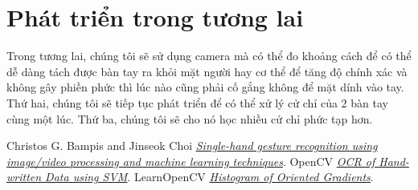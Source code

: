 \documentclass[a4paper, 12pt]{article}
\begin{document}
\section{Phát triển trong tương lai}
Trong tương lai, chúng tôi sẽ sử dụng camera mà có thể đo khoảng cách để có thể dễ dàng tách được bàn tay ra khỏi mặt người hay cơ thể để tăng độ chính xác và không gây phiền phức thì lúc nào cũng phải cố gắng không để mặt dính vào tay. Thứ hai, chúng tôi sẽ tiếp tục phát triển để có thể xử lý cử chỉ của 2 bàn tay cùng một lúc. Thứ ba, chúng tôi sẽ cho nó học nhiều cử chỉ phức tạp hơn.

\begin{thebibliography}{}
Christos G. Bampis and Jinseok Choi
\textit{\href{http://christosbampis.info/wp-content/uploads/2015/05/DigVidProject_2015.pdf}{Single-hand gesture recognition using image/video processing and machine learning techniques}}.
OpenCV
\textit{\href{https://docs.opencv.org/3.2.0/dd/d3b/tutorial_py_svm_opencv.html}{OCR of Hand-written Data using SVM}}.
LearnOpenCV
\textit{\href{https://www.learnopencv.com/histogram-of-oriented-gradients/}{Histogram of Oriented Gradients}}.
\end{thebibliography}
\end{document}
